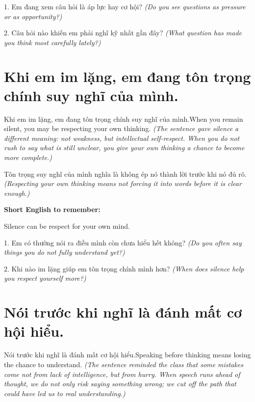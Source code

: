 \begin{tuhocnhanh}
1. Em đang xem câu hỏi là áp lực hay cơ hội? \textit{(Do you see questions as pressure or as opportunity?)}

2. Câu hỏi nào khiến em phải nghĩ kỹ nhất gần đây? \textit{(What question has made you think most carefully lately?)}
\end{tuhocnhanh}
\ngancach


\section{Khi em im lặng, em đang tôn trọng chính suy nghĩ của mình.}
\begin{truyen}{Khi em im lặng, em đang tôn trọng chính suy nghĩ của mình.}{When you remain silent, you may be respecting your own thinking.}
\textit{(The sentence gave silence a different meaning: not weakness, but intellectual self-respect. When you do not rush to say what is still unclear, you give your own thinking a chance to become more complete.)}
\end{truyen}

\begin{baihoc}
Tôn trọng suy nghĩ của mình nghĩa là không ép nó thành lời trước khi nó đủ rõ.
\textit{(Respecting your own thinking means not forcing it into words before it is clear enough.)}
\end{baihoc}

\begin{ghinhoanh}
\textbf{Short English to remember:}

Silence can be respect for your own mind.

\end{ghinhoanh}

\begin{tuhocnhanh}
1. Em có thường nói ra điều mình còn chưa hiểu hết không? \textit{(Do you often say things you do not fully understand yet?)}

2. Khi nào im lặng giúp em tôn trọng chính mình hơn? \textit{(When does silence help you respect yourself more?)}
\end{tuhocnhanh}
\ngancach


\section{Nói trước khi nghĩ là đánh mất cơ hội hiểu.}
\begin{truyen}{Nói trước khi nghĩ là đánh mất cơ hội hiểu.}{Speaking before thinking means losing the chance to understand.}
\textit{(The sentence reminded the class that some mistakes come not from lack of intelligence, but from hurry. When speech runs ahead of thought, we do not only risk saying something wrong; we cut off the path that could have led us to real understanding.)}
\end{truyen}

